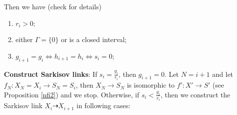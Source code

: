 \documentclass[11pt]{amsart}
\begin{document}
Then we have (check \cite[Lemma 4.4]{liuSarkisovProgramGeneralized2021} for details)
\begin{enumerate}
    \item $r_{i}>0$;
    \item either $\Gamma=\{0\} $ or is a closed interval;
    \item $g_{i+1}=g_{i} \Leftrightarrow h_{i+1}=h_{i} \Leftrightarrow s_{i}=0$;
\end{enumerate}
\textbf{Construct Sarkisov links}\label{Construction}: If $s_{i}=\frac{g_{i}}{r_{i}}$, then $g_{i+1}=0$. Let $N=i+1$  and let $f_{N}:X_{N}=X_{i} \to S_{N}=S_{i}$, then $X_{N}\to S_{N}$ is isomorphic to $f':X'\to S'$ (see Proposition \ref{nfi2}) and  we stop. Otherwise, if  $s_{i}<\frac{g_{i}}{r_{i}}$, then we construct the Sarkisov link $X_{i}\dashrightarrow X_{i+1}$ in following cases:
\end{document}
